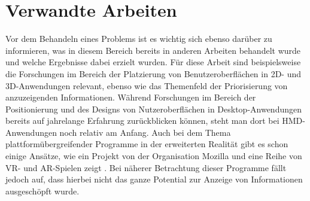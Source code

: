 
\chapter{Verwandte Arbeiten}\label{chapter:background}
	

	
		
		
		
		
		
	Vor dem Behandeln eines Problems ist es wichtig sich ebenso darüber zu informieren, was in diesem Bereich bereits in anderen Arbeiten behandelt wurde und welche Ergebnisse dabei erzielt wurden. Für diese Arbeit sind beispielsweise die Forschungen im Bereich der Platzierung von Benutzeroberflächen in 2D- und 3D-Anwendungen relevant, ebenso wie das Themenfeld der Priorisierung von anzuzeigenden Informationen.
	Während Forschungen im Bereich der Positionierung und des Designs von Nutzeroberflächen in Desktop-Anwendungen bereits auf jahrelange Erfahrung zurückblicken können, steht man dort bei HMD-Anwendungen noch relativ am Anfang.
	Auch bei dem Thema plattformübergreifender Programme in der erweiterten Realität gibt es schon einige Ansätze, wie ein Projekt von der Organisation Mozilla und eine Reihe von VR- und AR-Spielen zeigt \cite{firefox}\cite{crossCB}.
	Bei näherer Betrachtung dieser Programme fällt jedoch auf, dass hierbei nicht das ganze Potential zur Anzeige von Informationen ausgeschöpft wurde. 
		
